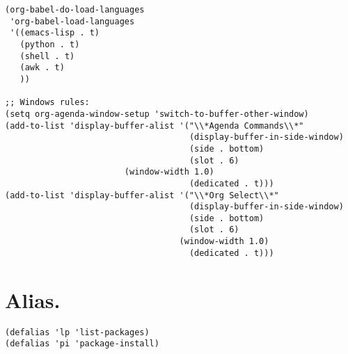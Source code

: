 \documentclass[11pt]{article}
\begin{document}
\begin{verbatim}
(org-babel-do-load-languages
 'org-babel-load-languages
 '((emacs-lisp . t)
   (python . t)
   (shell . t) 
   (awk . t)
   ))

;; Windows rules:
(setq org-agenda-window-setup 'switch-to-buffer-other-window)
(add-to-list 'display-buffer-alist '("\\*Agenda Commands\\*"
                                     (display-buffer-in-side-window)
                                     (side . bottom)
                                     (slot . 6)
                        (window-width 1.0)
                                     (dedicated . t)))
(add-to-list 'display-buffer-alist '("\\*Org Select\\*"
                                     (display-buffer-in-side-window)
                                     (side . bottom)
                                     (slot . 6)
                                   (window-width 1.0)
                                     (dedicated . t)))
\end{verbatim}
\section{Alias.}
\label{sec:orgf67cf63}
\begin{verbatim}
(defalias 'lp 'list-packages)
(defalias 'pi 'package-install)
\end{verbatim}
\end{document}
